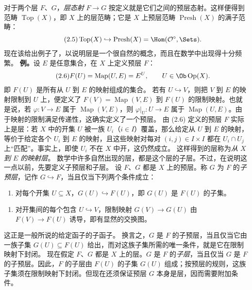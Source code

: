 对于两个层 $F$、$G$，\emph{层态射} $F\to G$ 按定义就是它们之间的预层态射。这样便得到范畴 $\operatorname{Top}(X)$，即 $X$ 上的层范畴；它是 $X$ 上预层范畴 $\operatorname{Presh}(X)$ 的满子范畴：
\begin{equation}\tag{2.5}
 \operatorname{Top}(X)\hookrightarrow\operatorname{Presh}(X)
 =\Hom(\mathcal O^{\circ},\Sets).
\end{equation}
现在该给出例子了，以说明层是一个很自然的概念，而且在数学中出现得十分频繁。
\textbf{例。}设 $E$ 是任意集合，在 $X$ 上定义预层 $F$：
\begin{equation}\tag{2.6}
 F(U)=\operatorname{Map}(U,E)=E^U,
 \qquad U\in\Ob\operatorname{Op}(X).
\end{equation}
即 $F(U)$ 是所有从 $U$ 到 $E$ 的映射组成的集合。
若有 $U\hookrightarrow V$，则把 $V$ 到 $E$ 的映射限制到 $U$ 上，便定义了 $F(V)=\operatorname{Map}(V,E)$ 到 $F(U)$ 的限制映射。也就是说，若 $\varphi\colon V\to E$ 属于 $\operatorname{Map}(V,E)$，则 $\varphi|_U\colon U\to E$ 属于 $\operatorname{Map}(U,E)$。由于映射的限制满足传递性，这确实定义了一个预层。
由 (2.6) 定义的预层 $F$ 实际上是层：若 $X$ 中的开集 $U$ 被一族 $U_i$（$i\in I$）覆盖，那么给定从 $U$ 到 $E$ 的映射，等价于给定各个 $U_i$ 到 $E$ 的映射，且这些映射对每对 $(i,j)\in I\times I$ 都在 $U_i\cap U_j$ 上“匹配”。事实上，即使 $U_i$ 不在 $X$ 中开，这仍然成立。
这样得到的层称为\emph{从 $X$ 到 $E$ 的映射层}。
数学中许多自然出现的层，都是这个层的子层。不过，在说明这一点以前，先要定义子预层和子层。
设 $F$、$G$ 都是 $X$ 上的预层。称 $G$ 为 $F$ 的\emph{子预层}，记作 $G\hookrightarrow F$，当且仅当下列两个条件成立：
\begin{enumerate}[label=\alph*)]
\item 对每个开集 $U\subseteq X$，$G(U)\hookrightarrow F(U)$，即 $G(U)$ 是 $F(U)$ 的子集。
\end{enumerate}
\begin{enumerate}[label=\alph*),start=2]
\item 对开集间的每个包含 $U\hookrightarrow V$，限制映射 $G(V)\to G(U)$ 由 $F(V)\to F(U)$ 诱导，即有显然的交换图。
\end{enumerate}
这正是一般所说的给定函子的子函子。
换言之，$G$ 是 $F$ 的子预层，当且仅当它由一族子集 $G(U)\subseteq F(U)$ 给出，而对这族子集所需的唯一条件，就是它在限制映射下封闭。
现在假定 $F$、$G$ 都是 $X$ 上的层。$G$ 是 $F$ 的\emph{子层}，当且仅当 $G$ 是 $F$ 的子预层。因此，$F$ 的子层由 $F(U)$ 的子集 $G(U)$ 组成；按预层的规则，这族子集须在限制映射下封闭。但现在还须保证预层 $G$ 本身是层，因而需要附加条件。
